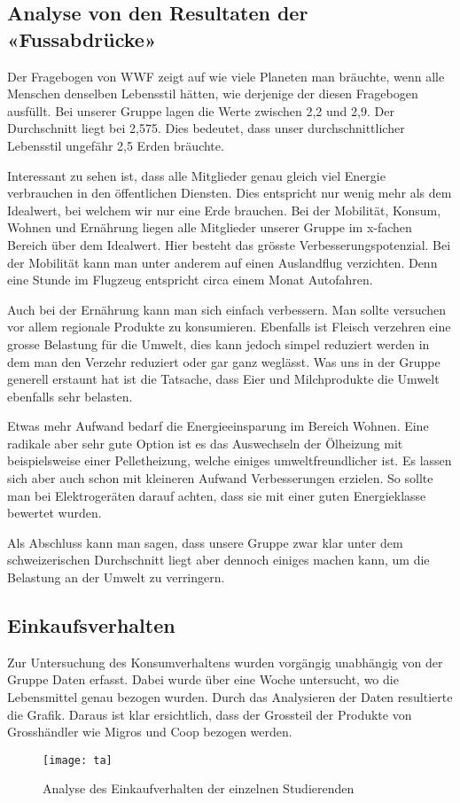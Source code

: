 \subsection{Analyse von den Resultaten der «Fussabdrücke»}
Der Fragebogen von WWF zeigt auf wie viele Planeten man bräuchte,  wenn alle Menschen denselben
Lebensstil hätten, wie derjenige der diesen Fragebogen ausfüllt. Bei unserer Gruppe lagen die Werte
zwischen 2,2 und 2,9. Der Durchschnitt liegt bei 2,575. Dies bedeutet, dass unser durchschnittlicher Lebensstil ungefähr 2,5 Erden bräuchte.

Interessant zu sehen ist, dass alle Mitglieder genau gleich viel Energie verbrauchen in den
öffentlichen Diensten. Dies entspricht nur wenig mehr als dem Idealwert, bei welchem wir nur eine
Erde brauchen. Bei der Mobilität, Konsum, Wohnen und Ernährung liegen alle Mitglieder unserer Gruppe
im x-fachen Bereich über dem Idealwert. Hier besteht das grösste Verbesserungspotenzial. Bei der
Mobilität kann man unter anderem auf einen Auslandflug verzichten. Denn eine Stunde im Flugzeug entspricht circa einem Monat Autofahren. 

Auch bei der Ernährung kann man sich einfach verbessern. Man sollte versuchen vor allem regionale
Produkte zu konsumieren. Ebenfalls ist Fleisch verzehren eine grosse Belastung für die Umwelt, dies
kann jedoch simpel reduziert werden in dem man den Verzehr reduziert oder gar ganz weglässt. Was uns
in der Gruppe generell erstaunt hat ist die Tatsache,  dass Eier und Milchprodukte die Umwelt ebenfalls sehr belasten. 

Etwas mehr Aufwand bedarf die Energieeinsparung im Bereich Wohnen. Eine radikale aber sehr gute
Option ist es das Auswechseln der Ölheizung mit beispielsweise einer Pelletheizung, welche einiges
umweltfreundlicher ist. 
Es lassen sich aber auch schon mit kleineren Aufwand Verbesserungen erzielen. So sollte man bei
Elektrogeräten darauf achten, dass sie mit einer guten Energieklasse bewertet wurden.
 
Als Abschluss kann man sagen, dass unsere Gruppe zwar klar unter dem schweizerischen Durchschnitt
liegt aber dennoch einiges machen kann, um die Belastung an der Umwelt zu verringern. 

\subsection{Einkaufsverhalten}

Zur Untersuchung des Konsumverhaltens wurden vorgängig unabhängig von der Gruppe Daten erfasst.
Dabei wurde über eine Woche untersucht, wo die Lebensmittel genau bezogen wurden. Durch das
Analysieren der Daten resultierte die Grafik. Daraus ist klar ersichtlich, dass der Grossteil der Produkte von Grosshändler wie Migros und Coop bezogen werden.
 \begin{figure}[H]
	\centering
	\texttt{[image: ta]}
	\caption{Analyse des Einkaufverhalten der einzelnen Studierenden}
\end{figure}

